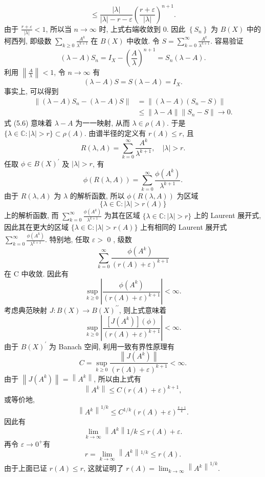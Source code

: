 \documentclass[openany]{ctexbook}
\makeatletter
\theoremstyle{kaiti}
\theoremstyle{normal}
\renewenvironment{proof}[1][\proofname]{\par
    \pushQED{\qed}%
    \normalfont \topsep6\p@\@plus6\p@\relax
    \trivlist
    \item\relax
    {\heiti #1}\hspace{2\labelsep}\ignorespaces
  }{%
    \popQED\endtrivlist\@endpefalse
  }
\makeatother
\begin{document}
\begin{proof}
$$$$
$$
\leqslant \frac{|\lambda|}{|\lambda|-r-\varepsilon}\left(\frac{r+\varepsilon}{|\lambda|}\right)^{n+1}.
$$
由于 $\frac{r+\varepsilon}{|\lambda|}<1$, 所以当 $n \rightarrow \infty$ 时, 上式右端收敛到 0. 因此 $\left\{S_n\right\}$ 为 $B(X)$ 中的柯西列, 即级数 $\sum_{k \geqslant 0} \frac{A^{k}}{\lambda^{k+1}}$ 在 $B(X)$ 中收敛. 令 $S=\sum_{k=0}^{\infty} \frac{A^{k}}{\lambda^{k+1}}$. 容易验证
$$
(\lambda-A) S_n=I_{X}-\left(\frac{A}{\lambda}\right)^{n+1}=S_n(\lambda-A).
$$
利用 $\left\|\frac{A}{\lambda}\right\|<1$, 令 $n \rightarrow \infty$ 有
\begin{equation}
  (\lambda-A) S=S(\lambda-A)=I_{X}.
\end{equation}
事实上, 可以得到
$$
\begin{aligned}
\left\|(\lambda-A) S_n-(\lambda-A) S\right\| &=\left\|(\lambda-A)\left(S_n-S\right)\right\| \\
& \leqslant\|\lambda-A\|\left\|S_n-S\right\| \rightarrow 0.
\end{aligned}
$$
式 (5.6) 意味着 $\lambda-A$ 为一一映射, 从而 $\lambda \in \rho(A)$. 于是 $\{\lambda \in \mathbb{C}:|\lambda|>r\} \subset \rho(A)$. 由谱半径的定义有 $r(A) \leqslant r$, 且
$$
R(\lambda, A)=\sum_{k=0}^{\infty} \frac{A^{k}}{\lambda^{k+1}}, \quad|\lambda|>r.
$$
任取 $\phi \in B(X)^{\prime}$ 及 $|\lambda|>r$, 有
$$
\phi(R(\lambda, A))=\sum_{k=0}^{\infty} \frac{\phi\left(A^{k}\right)}{\lambda^{k+1}}.
$$
由于 $R(\lambda, A)$ 为 $\lambda$ 的解析函数, 所以 $\phi(R(\lambda, A))$ 为区域
$$
\{\lambda \in \mathbb{C}:|\lambda|>r(A)\}
$$
上的解析函数, 而 $\sum_{k=0}^{\infty} \frac{\phi\left(A^{k}\right)}{\lambda^{k+1}}$ 为其在区域 $\{\lambda \in \mathbb{C}:|\lambda|>r\}$ 上的 Laurent 展开式, 因此其在更大的区域 $\{\lambda \in \mathbb{C}:|\lambda|>r(A)\}$ 上有相同的 Laurent 展开式 $\sum_{k=0}^{\infty} \frac{\phi\left(A^{k}\right)}{\lambda^{k+1}}$. 特别地, 任取 $\varepsilon>$ 0 , 级数
$$
\sum_{k=0}^{\infty} \frac{\phi\left(A^{k}\right)}{(r(A)+\varepsilon)^{k+1}}
$$
在 C 中收敛. 因此有
$$
\sup_{k \geqslant 0}\left|\frac{\phi\left(A^{k}\right)}{(r(A)+\varepsilon)^{k+1}}\right|<\infty.
$$
考虑典范映射 $J: B(X) \rightarrow B(X)^{\prime \prime}$, 则上式意味着
$$
\sup_{k \geqslant 0}\left|\frac{\left[J\left(A^{k}\right)\right](\phi)}{(r(A)+\varepsilon)^{k+1}}\right|<\infty.
$$
由于 $B(X)^{\prime}$ 为 Banach 空间, 利用一致有界性原理有
$$
C=\sup_{k \geqslant 0} \frac{\left\|J\left(A^{k}\right)\right\|}{(r(A)+\varepsilon)^{k+1}}<\infty.
$$
由于 $\left\|J\left(A^{k}\right)\right\|=\left\|A^{k}\right\|$, 所以由上式有
$$
\left\|A^{k}\right\| \leqslant C(r(A)+\varepsilon)^{k+1},
$$
或等价地,
$$
\left\|A^{k}\right\|^{1 / k} \leqslant C^{1 / k}(r(A)+\varepsilon)^{\frac{k+1}{k}}.
$$
因此有
$$
\lim_{k \rightarrow \infty}\left\|A^{k}\right\| 1 / k \leqslant r(A)+\varepsilon.
$$
再令 $\varepsilon \rightarrow 0^{+}$有
$$
r=\lim_{k \rightarrow \infty}\left\|A^{k}\right\|{ }^{1 / k} \leqslant r(A).
$$
由于上面已证 $r(A) \leqslant r$, 这就证明了 $r(A)=\lim_{k \rightarrow \infty}\left\|A^{k}\right\|^{1 / k}$.
\end{proof}
\end{document}
